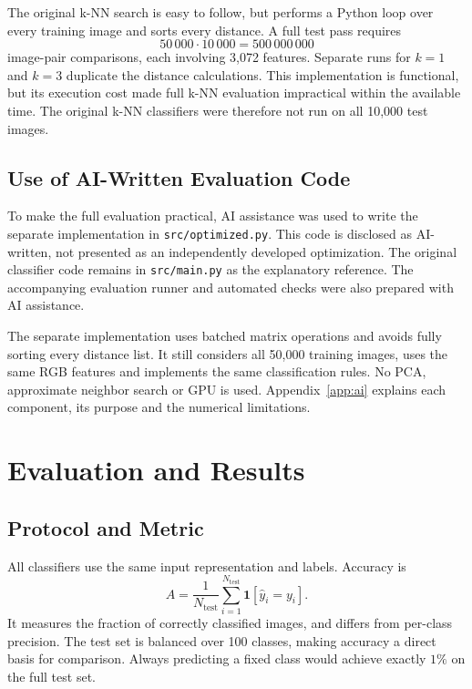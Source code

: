 \documentclass[letterpaper,journal]{IEEEtran}
\newcommand{\code}[1]{\texttt{#1}}
\newcommand{\test}{\mathrm{test}}
\begin{document}
The original k-NN search is easy to follow, but performs a Python loop over
every training image and sorts every distance. A full test pass requires
\begin{equation}
50\,000\cdot10\,000=500\,000\,000
\end{equation}
image-pair comparisons, each involving 3,072 features. Separate runs for
$k=1$ and $k=3$ duplicate the distance calculations. This implementation
is functional, but its execution cost made full k-NN evaluation impractical
within the available time. The original k-NN classifiers were therefore not
run on all 10,000 test images.

\subsection{Use of AI-Written Evaluation Code}
To make the full evaluation practical, AI assistance was used to write the
separate implementation in \code{src/optimized.py}. This code is disclosed as
AI-written, not presented as an independently developed optimization. The
original classifier code remains in \code{src/main.py} as the explanatory
reference. The accompanying evaluation runner and automated checks were also
prepared with AI assistance.

The separate implementation uses batched matrix operations and avoids fully
sorting every distance list. It still considers all 50,000 training images,
uses the same RGB features and implements the same classification rules.
No PCA, approximate neighbor search or GPU is used. Appendix~\ref{app:ai}
explains each component, its purpose and the numerical limitations.

\section{Evaluation and Results}
\subsection{Protocol and Metric}
All classifiers use the same input representation and labels. Accuracy is
\begin{equation}
A=\frac{1}{N_{\test}}\sum_{i=1}^{N_{\test}}
\mathbf{1}[\widehat{y}_i=y_i].
\end{equation}
It measures the fraction of correctly classified images, and differs from
per-class precision. The test set is balanced over 100 classes, making
accuracy a direct basis for comparison. Always predicting a fixed class
would achieve exactly $1\%$ on the full test set.
\end{document}
